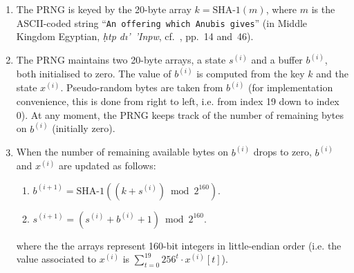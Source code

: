 \documentclass{llncs}
\begin{document}
\begin{enumerate}
\item The PRNG is keyed by the 20-byte array $k = \textrm{SHA-1}(m)$,
where $m$ is the ASCII-coded string ``\texttt{An offering which
Anubis gives}'' (in Middle Kingdom Egyptian, \emph{\d{h}tp
d\i\!\!'\ 'Inpw}, cf.~\cite{motto}, pp.~14 and~46).
\item The PRNG maintains two 20-byte arrays, a state $s^{(i)}$ and
a buffer $b^{(i)}$, both initialised to zero.  The value of $b^{(i)}$ is
computed from the key $k$ and the state $x^{(i)}$.  Pseudo-random bytes are
taken from $b^{(i)}$ (for implementation convenience, this is done from right
to left, i.e. from index 19 down to index 0). At any moment, the PRNG keeps
track of the number of remaining bytes on $b^{(i)}$ (initially zero).
\item When the number of remaining available bytes on $b^{(i)}$ drops to zero,
$b^{(i)}$ and $x^{(i)}$ are updated as follows:
    \begin{enumerate}
    \item $b^{(i+1)} = \textrm{SHA-1}((k + s^{(i)}) \bmod 2^{160}).$
    \item $s^{(i+1)} = (s^{(i)} + b^{(i)} + 1) \bmod 2^{160}.$
    \end{enumerate}
where the the arrays represent 160-bit integers in little-endian order (i.e.
the value associated to $x^{(i)}$ is $\sum_{t=0}^{19}{256^t \cdot x^{(i)}[t]}$).
\end{enumerate}
\end{document}
